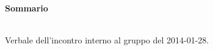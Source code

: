 \noindent\begin{Large}\textbf{Sommario}\end{Large}\\

Verbale dell'incontro interno al gruppo \gruppo{} del 2014-01-28.\\